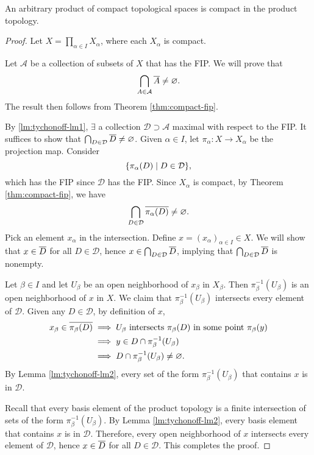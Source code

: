 \begin{thm}[Tychonoff]
    An arbitrary product of compact topological spaces is compact in the product topology.
    \begin{proof}
        Let $X = \prod_{\alpha \in I} X_\alpha$, where each $X_\alpha$ is compact. 

        Let $\mathcal A$ be a collection of subsets of $X$ that has the FIP. We will prove that
        \[
        \bigcap_{A\in \mathcal A} \Bar A \neq \emptyset.
        \]
        The result then follows from Theorem \ref{thm:compact-fip}. 

        By \ref{lm:tychonoff-lm1}, $\exists$ a collection $\mathcal D \supset \mathcal A$ maximal with respect to the FIP. It suffices to show that $\bigcap_{D\in \mathcal D} \Bar D \neq \emptyset$. Given $\alpha \in I$, let $\pi_\alpha: X \to X_\alpha$ be the projection map. Consider
        \[
        \set{\pi_\alpha(D) \mid D \in \mathcal D},
        \]
        which has the FIP since $\mathcal D$ has the FIP. Since $X_\alpha$ is compact, by Theorem \ref{thm:compact-fip}, we have
        \[
        \bigcap_{D\in \mathcal D} \Bar{\pi_\alpha(D)} \neq \emptyset.
        \]
        Pick an element $x_\alpha$ in the intersection. Define $x = (x_\alpha)_{\alpha \in I} \in X$. We will show that $x \in \Bar D$ for all $D \in \mathcal D$, hence $x \in \bigcap_{D\in \mathcal D} \Bar D$, implying that $\bigcap_{D\in \mathcal D} \Bar D$ is nonempty. 
        
        Let $\beta \in I$ and let $U_\beta$ be an open neighborhood of $x_\beta$ in $X_\beta$. Then $\pi_\beta^{-1}(U_\beta)$ is an open neighborhood of $x$ in $X$. We claim that $\pi_\beta^{-1}(U_\beta)$ intersects every element of $\mathcal D$. Given any $D \in \mathcal D$, by definition of $x$, 
        \begin{align*}
            x_\beta \in \Bar{\pi_\beta(D)} &\implies U_\beta \text{ intersects } \pi_\beta(D) \text{ in some point } \pi_\beta(y) \\
            &\implies y \in D \cap \pi_\beta^{-1}(U_\beta) \\
            &\implies D \cap \pi_\beta^{-1}(U_\beta) \neq \emptyset.
        \end{align*}
        By Lemma \ref{lm:tychonoff-lm2}, every set of the form $\pi_\beta^{-1}(U_\beta)$ that contains $x$ is in $\mathcal D$. 

        Recall that every basis element of the product topology is a finite intersection of sets of the form $\pi_\beta^{-1}(U_\beta)$. By Lemma \ref{lm:tychonoff-lm2}, every basis element that contains $x$ is in $\mathcal D$. Therefore, every open neighborhood of $x$ intersects every element of $\mathcal D$, hence $x \in \Bar D$ for all $D \in \mathcal D$. This completes the proof.
    \end{proof}
\end{thm}

